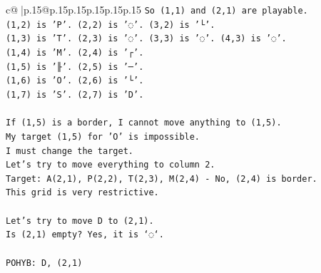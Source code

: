 \documentclass{article}
\begin{document}
{\begin{supertabular}{c@{$\;$}|p{.15\linewidth}@{}p{.15\linewidth}p{.15\linewidth}p{.15\linewidth}p{.15\linewidth}p{.15\linewidth}}
{{{\texttt{So (1,1) and (2,1) are playable.} \\
\texttt{(1,2) is 'P'. (2,2) is '◌'. (3,2) is '└'.} \\
\texttt{(1,3) is 'T'. (2,3) is '◌'. (3,3) is '◌'. (4,3) is '◌'.} \\
\texttt{(1,4) is 'M'. (2,4) is '┌'.} \\
\texttt{(1,5) is '╟'. (2,5) is '─'.} \\
\texttt{(1,6) is 'O'. (2,6) is '└'.} \\
\texttt{(1,7) is 'S'. (2,7) is 'D'.} \\
\\ 
\texttt{If (1,5) is a border, I cannot move anything to (1,5).} \\
\texttt{My target (1,5) for 'O' is impossible.} \\
\texttt{I must change the target.} \\
\texttt{Let's try to move everything to column 2.} \\
\texttt{Target: A(2,1), P(2,2), T(2,3), M(2,4) {-} No, (2,4) is border.} \\
\texttt{This grid is very restrictive.} \\
\\ 
\texttt{Let's try to move D to (2,1).} \\
\texttt{Is (2,1) empty? Yes, it is `◌`.} \\
\\ 
\texttt{POHYB: D, (2,1)} \\
            }
        }
    }
     \\ \\


\end{supertabular}}
\end{document}
